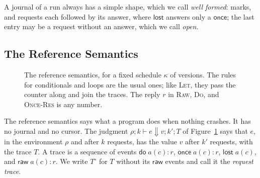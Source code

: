 \documentclass[acmsmall,nonacm,screen]{acmart}
\newcommand{\kw}[1]{\mathsf{#1}}
\newcommand{\letin}[3]{\kw{let}\;#1 = #2\;\kw{in}\;#3}
\newcommand{\once}[5]{\kw{once}\;#1(#2)\;\kw{as}\;#3\;\kw{then}\;#4\;\kw{else}\;#5}
\newcommand{\gate}[3]{\kw{gate}\;#1\;\kw{then}\;#2\;\kw{else}\;#3}
\newcommand{\lost}{\kw{lost}}
\newcommand{\sem}[1]{[\![#1]\!]}
\newcommand{\evto}{\Downarrow}
\newcommand{\rqt}[1]{#1^{\circ}}
\begin{document}
A journal of a run always has a simple shape, which we call \emph{well formed}: marks, and
requests each followed by its answer, where $\lost$ answers only a $\kw{once}$; the last entry
may be a request without an answer, which we call \emph{open}.

\subsection{The Reference Semantics}
\label{sec:reference}

\begin{figure}[t]
\caption{The reference semantics, for a fixed schedule $\kappa$ of versions. The rules for
conditionals and loops are the usual ones; like \textsc{Let}, they pass the counter along and
join the traces. The reply $r$ in \textsc{Raw}, \textsc{Do}, and \textsc{Once-Res} is any
number.}
\label{fig:reference}
\end{figure}

The reference semantics says what a program does when nothing crashes. It has no journal and
no cursor. The judgment $\rho; k \vdash e \evto v; k'; T$ of Figure~\ref{fig:reference} says
that $e$, in the environment $\rho$ and after $k$ requests, has the value $v$ after $k'$
requests, with the trace $T$. A trace is a sequence of events $\kw{do}\;a(c){:}r$,
$\kw{once}\;a(c){:}r$, $\kw{lost}\;a(c)$, and $\kw{raw}\;a(c){:}r$. We write $\rqt{T}$ for $T$
without its $\kw{raw}$ events and call it the \emph{request trace}.
\end{document}
